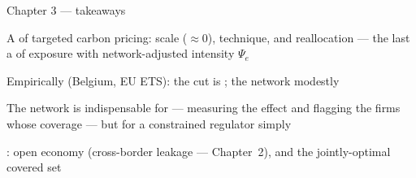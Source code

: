 \begin{frame}{Chapter 3 --- takeaways}

    \begin{wideitemize}
        \item A  of targeted carbon pricing: scale ($\approx 0$), technique, and reallocation --- the last a  of exposure with network-adjusted intensity $\Psi_e$

        \item Empirically (Belgium, EU ETS): the cut is ; the network  modestly

        \item The network is indispensable for  --- measuring the effect and flagging the firms whose coverage  --- but for  a constrained regulator simply 

        \item[] : open economy (cross-border leakage --- Chapter~2), and the jointly-optimal covered set
    \end{wideitemize}

\end{frame}
